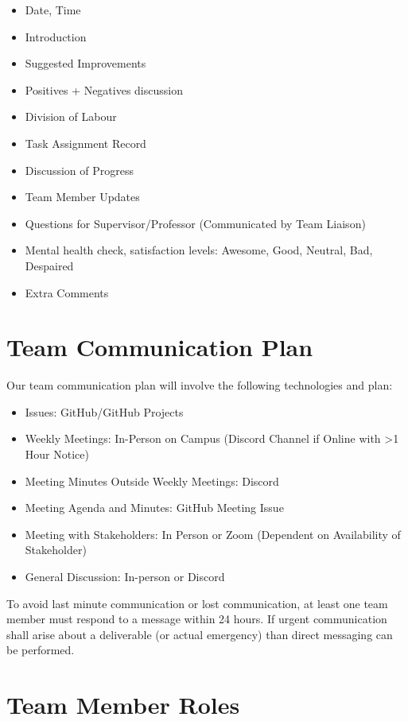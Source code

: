 \documentclass{article}
\begin{document}
\begin{itemize}
  \item Date, Time
  \item Introduction
  \item Suggested Improvements
  \item Positives + Negatives discussion
  \item Division of Labour
  \item Task Assignment Record
  \item Discussion of Progress
  \item Team Member Updates
  \item Questions for Supervisor/Professor (Communicated by Team Liaison)
  \item Mental health check, satisfaction levels: Awesome, Good, Neutral, Bad, Despaired
  \item Extra Comments
\end{itemize}

\section{Team Communication Plan}

Our team communication plan will involve the following technologies and plan:
\begin{itemize}
  \item Issues: GitHub/GitHub Projects
  \item Weekly Meetings: In-Person on Campus (Discord Channel if Online with >1 Hour Notice)
  \item Meeting Minutes Outside Weekly Meetings: Discord
  \item Meeting Agenda and Minutes: GitHub Meeting Issue
  \item Meeting with Stakeholders: In Person or Zoom (Dependent on Availability of Stakeholder)
  \item General Discussion: In-person or Discord
\end{itemize}

To avoid last minute communication or lost communication, at least one team member must 
respond to a message within 24 hours. If urgent communication shall arise about a 
deliverable (or actual emergency) than direct messaging can be performed.

\section{Team Member Roles}
\end{document}
